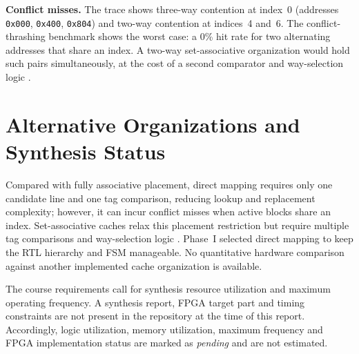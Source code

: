 \documentclass[conference,a4paper]{IEEEtran}
\begin{document}
\textbf{Conflict misses.} The trace shows three-way contention at index~0 (addresses \texttt{0x000}, \texttt{0x400}, \texttt{0x804}) and two-way contention at indices~4 and~6. The conflict-thrashing benchmark shows the worst case: a 0\% hit rate for two alternating addresses that share an index. A two-way set-associative organization would hold such pairs simultaneously, at the cost of a second comparator and way-selection logic \cite{patterson,iitkgp}.

\section{Alternative Organizations and Synthesis Status}\label{sec:alt}
Compared with fully associative placement, direct mapping requires only one candidate line and one tag comparison, reducing lookup and replacement complexity; however, it can incur conflict misses when active blocks share an index. Set-associative caches relax this placement restriction but require multiple tag comparisons and way-selection logic \cite{patterson,iitkgp}. Phase~I selected direct mapping to keep the RTL hierarchy and FSM manageable. No quantitative hardware comparison against another implemented cache organization is available.

The course requirements call for synthesis resource utilization and maximum operating frequency. A synthesis report, FPGA target part and timing constraints are not present in the repository at the time of this report. Accordingly, logic utilization, memory utilization, maximum frequency and FPGA implementation status are marked as \emph{pending} and are not estimated.

\end{document}
